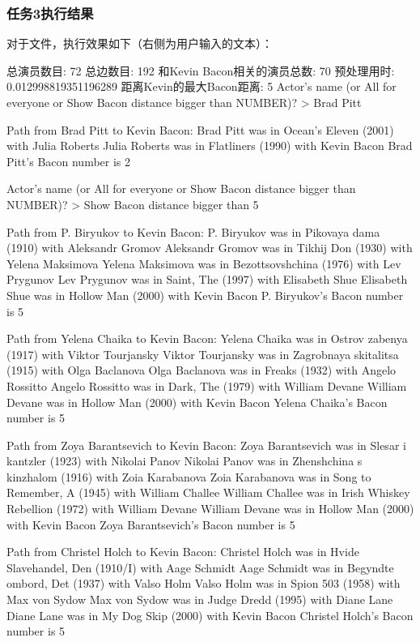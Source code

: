 \documentclass[12pt, a4paper, oneside]{ctexart}
\numberwithin{equation}{section}  %
\begin{document}
\subsubsection{任务3执行结果}
对于文件，执行效果如下（\pythoninline{> }右侧为用户输入的文本）：
\begin{pythoncode}
总演员数目: 72
总边数目: 192
和Kevin Bacon相关的演员总数: 70
预处理用时: 0.012998819351196289
距离Kevin的最大Bacon距离: 5
Actor's name (or All for everyone or Show Bacon distance bigger than NUMBER)?
> Brad Pitt

Path from Brad Pitt to Kevin Bacon:
Brad Pitt was in Ocean's Eleven (2001) with Julia Roberts
Julia Roberts was in Flatliners (1990) with Kevin Bacon
Brad Pitt's Bacon number is 2

Actor's name (or All for everyone or Show Bacon distance bigger than NUMBER)?
> Show Bacon distance bigger than 5 

Path from P. Biryukov to Kevin Bacon:
P. Biryukov was in Pikovaya dama (1910) with Aleksandr Gromov
Aleksandr Gromov was in Tikhij Don (1930) with Yelena Maksimova
Yelena Maksimova was in Bezottsovshchina (1976) with Lev Prygunov
Lev Prygunov was in Saint, The (1997) with Elisabeth Shue
Elisabeth Shue was in Hollow Man (2000) with Kevin Bacon
P. Biryukov's Bacon number is 5


Path from Yelena Chaika to Kevin Bacon:
Yelena Chaika was in Ostrov zabenya (1917) with Viktor Tourjansky
Viktor Tourjansky was in Zagrobnaya skitalitsa (1915) with Olga Baclanova
Olga Baclanova was in Freaks (1932) with Angelo Rossitto
Angelo Rossitto was in Dark, The (1979) with William Devane
William Devane was in Hollow Man (2000) with Kevin Bacon
Yelena Chaika's Bacon number is 5


Path from Zoya Barantsevich to Kevin Bacon:
Zoya Barantsevich was in Slesar i kantzler (1923) with Nikolai Panov
Nikolai Panov was in Zhenshchina s kinzhalom (1916) with Zoia Karabanova
Zoia Karabanova was in Song to Remember, A (1945) with William Challee
William Challee was in Irish Whiskey Rebellion (1972) with William Devane
William Devane was in Hollow Man (2000) with Kevin Bacon
Zoya Barantsevich's Bacon number is 5


Path from Christel Holch to Kevin Bacon:
Christel Holch was in Hvide Slavehandel, Den (1910/I) with Aage Schmidt
Aage Schmidt was in Begyndte ombord, Det (1937) with Valso Holm
Valso Holm was in Spion 503 (1958) with Max von Sydow
Max von Sydow was in Judge Dredd (1995) with Diane Lane
Diane Lane was in My Dog Skip (2000) with Kevin Bacon
Christel Holch's Bacon number is 5    
\end{pythoncode}
\end{document}
